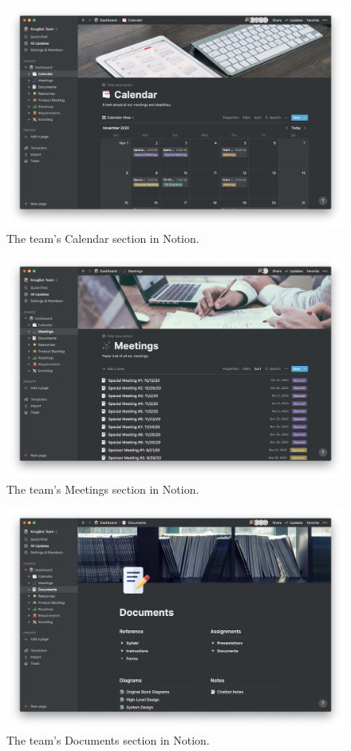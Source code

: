 \documentclass[titlepage, 12pt]{article}
\begin{document}
\begin{figure}[p]
    \centering\includegraphics[width=1\linewidth]{images/pm/calendar.png}
    \caption{The team's Calendar section in Notion.}
\end{figure}

\begin{figure}[p]
    \centering\includegraphics[width=1\linewidth]{images/pm/meetings.png}
    \caption{The team's Meetings section in Notion.}
\end{figure}

\begin{figure}[p]
    \centering\includegraphics[width=1\linewidth]{images/pm/documents.png}
    \caption{The team's Documents section in Notion.}
\end{figure}
\end{document}
